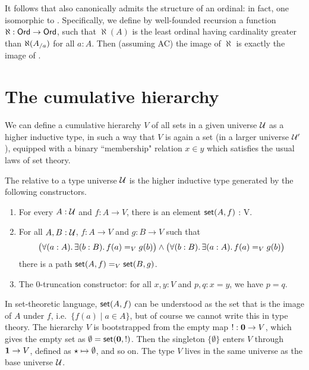 It follows that \card also canonically admits the structure of an ordinal: in fact, one isomorphic to \ord.
Specifically, we define by well-founded recursion a function $\aleph:\ord\to\ord$, such that $\aleph(A)$ is the least ordinal having cardinality greater than $\aleph({\ordsl A a})$ for all $a:A$.
Then (assuming AC) the image of $\aleph$ is exactly the image of \card.


\section{The cumulative hierarchy}
\label{sec:cumulative-hierarchy}

We can define a cumulative hierarchy $V$ of all sets in a given universe $\UU$ as a higher inductive type, in such a way that $V$ is again a set (in a larger universe $\UU'$), equipped with a binary ``membership" relation $x\in y$ which satisfies the usual laws of set theory.

\begin{defn}
  The  relative to a type universe $\UU$ is the
  higher inductive type generated by the following constructors.
  \begin{enumerate}
  \item For every $A : \UU$ and $f : A \to V$, there is an element $\vset(A, f)$ : V.
  \item For all $A, B : \UU$, $f : A \to V$ and $g : B \to V$ such that
    \begin{equation} \label{eq:V-path}
      \big(\fall{a:A} \exis{b:B} \id[V]{f(a)}{g(b)}\big) \land \big(\fall{b:B} \exis{a:A} \id[V]{f(a)}{g(b)}\big)
    \end{equation}
    there is a path $\id[V]{\vset(A,f)}{\vset(B,g)}$.
  \item The 0-truncation constructor: for all $x,y:V$ and $p,q:x=y$, we have $p=q$.
  \end{enumerate}
\end{defn}

In set-theoretic language, $\vset(A,f)$ can be understood as the set that is the image of $A$ under $f$, i.e.\ $\{ f(a) \mid a
\in A \}$, but of course we cannot write this in type theory. The hierarchy $V$ is
bootstrapped from the empty map $! : \emptyt \to V$, which gives the empty set as $\emptyset = \vset(\emptyt,!)$.
Then the singleton $\{\emptyset\}$ enters $V$ through $\unit \to V$, defined as $\ttt \mapsto \emptyset$, and so
on. The type $V$ lives in the same universe as the base universe $\UU$.

